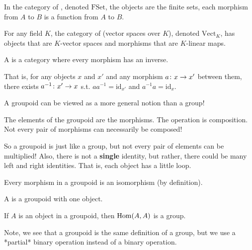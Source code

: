 \documentclass[11pt,leqno,oneside]{amsart}
\numberwithin{thm}{section}
\newcommand{\id}{\text{id}}
\begin{document}
\begin{defn}
  In the category of , denoted $\text{FSet}$, the
  objects are the finite sets, each morphism from $A$ to $B$ is a
  function from $A$ to $B$.
\end{defn}
\begin{defn}
  For any field $K$, the category of  (vector spaces over $K$), denoted
  $\text{Vect}_K$, has objects that are $K$-vector spaces and
  morphisms that are $K$-linear maps.
\end{defn}
\begin{defn}
  A  is a category where every morphism has an inverse.

  That is, for any objects $x$ and $x'$ and any morphism $a \colon x \to x'$ between them, there exists $a^{-1} \colon x' \to x$
  s.t. $aa^{-1} = \id_{x'}$ and $a^{-1}a = \id_{x}$.
\end{defn}
\begin{rmk}
  A groupoid can be viewed as a more general notion than a group!

  The elements of the groupoid are the morphisms.  The operation is composition.  Not every pair of morphisms can necessarily be composed!

  So a groupoid is just like a group, but not every pair of elements can be multiplied!  Also, there is not a \textbf{single} identity, but rather, there could be many left and right identities.  That is, each object has a little loop.
\end{rmk}
\begin{prop}
  Every morphism in a groupoid is an isomorphism (by definition).
\end{prop}
\begin{defn}
  A  is a groupoid with one object.
\end{defn}
\begin{prop}
  If $A$ is an object in a groupoid, then $\operatorname{Hom}(A, A)$ is a group.
\end{prop}

Note, we see that a groupoid is the same definition of a group, but we
use a *partial* binary operation instead of a binary operation.
\end{document}

